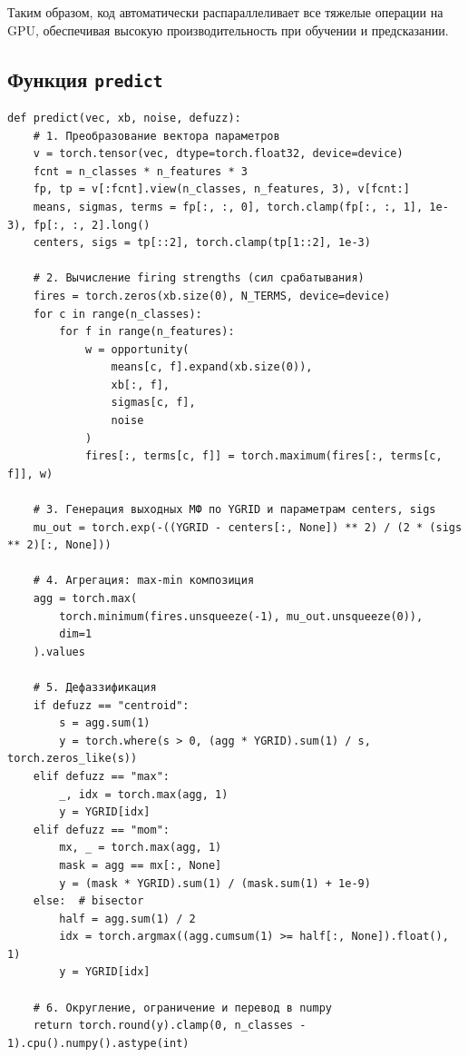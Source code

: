 Таким образом, код автоматически распараллеливает все тяжелые операции на GPU, обеспечивая высокую производительность при обучении и предсказании.


\subsection{Функция \texttt{predict}}

\begin{verbatim}
def predict(vec, xb, noise, defuzz):
    # 1. Преобразование вектора параметров
    v = torch.tensor(vec, dtype=torch.float32, device=device)
    fcnt = n_classes * n_features * 3
    fp, tp = v[:fcnt].view(n_classes, n_features, 3), v[fcnt:]
    means, sigmas, terms = fp[:, :, 0], torch.clamp(fp[:, :, 1], 1e-3), fp[:, :, 2].long()
    centers, sigs = tp[::2], torch.clamp(tp[1::2], 1e-3)

    # 2. Вычисление firing strengths (сил срабатывания)
    fires = torch.zeros(xb.size(0), N_TERMS, device=device)
    for c in range(n_classes):
        for f in range(n_features):
            w = opportunity(
                means[c, f].expand(xb.size(0)),
                xb[:, f],
                sigmas[c, f],
                noise
            )
            fires[:, terms[c, f]] = torch.maximum(fires[:, terms[c, f]], w)

    # 3. Генерация выходных МФ по YGRID и параметрам centers, sigs
    mu_out = torch.exp(-((YGRID - centers[:, None]) ** 2) / (2 * (sigs ** 2)[:, None]))

    # 4. Агрегация: max-min композиция
    agg = torch.max(
        torch.minimum(fires.unsqueeze(-1), mu_out.unsqueeze(0)),
        dim=1
    ).values

    # 5. Дефаззификация
    if defuzz == "centroid":
        s = agg.sum(1)
        y = torch.where(s > 0, (agg * YGRID).sum(1) / s, torch.zeros_like(s))
    elif defuzz == "max":
        _, idx = torch.max(agg, 1)
        y = YGRID[idx]
    elif defuzz == "mom":
        mx, _ = torch.max(agg, 1)
        mask = agg == mx[:, None]
        y = (mask * YGRID).sum(1) / (mask.sum(1) + 1e-9)
    else:  # bisector
        half = agg.sum(1) / 2
        idx = torch.argmax((agg.cumsum(1) >= half[:, None]).float(), 1)
        y = YGRID[idx]

    # 6. Округление, ограничение и перевод в numpy
    return torch.round(y).clamp(0, n_classes - 1).cpu().numpy().astype(int)
\end{verbatim}


